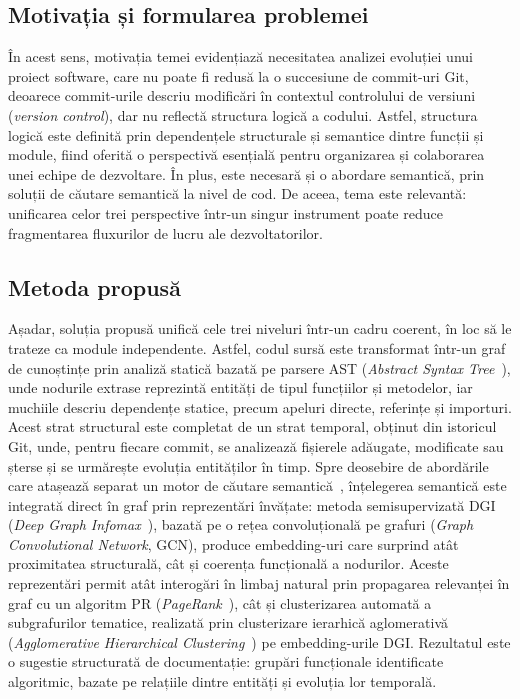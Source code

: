 \documentclass[12pt]{article}
\numberwithin{equation}{section}
\numberwithin{figure}{section}
\numberwithin{table}{section}
\theoremstyle{definition}
\theoremstyle{plain}
\begin{document}
\subsection{Motivația și formularea problemei}

În acest sens, motivația temei evidențiază necesitatea analizei evoluției unui proiect software, care nu poate fi redusă la o succesiune de commit-uri Git, deoarece commit-urile descriu modificări în contextul controlului de versiuni (\textit{version control}), dar nu reflectă structura logică a codului. Astfel, structura logică este definită prin dependențele structurale și semantice dintre funcții și module, fiind oferită o perspectivă esențială pentru organizarea și colaborarea unei echipe de dezvoltare. În plus, este necesară și o abordare semantică, prin soluții de căutare semantică la nivel de cod. De aceea, tema este relevantă: unificarea celor trei perspective într-un singur instrument poate reduce fragmentarea fluxurilor de lucru ale dezvoltatorilor.

\subsection{Metoda propusă}

Așadar, soluția propusă unifică cele trei niveluri într-un cadru coerent, în loc să le trateze ca module independente. Astfel, codul sursă este transformat într-un graf de cunoștințe prin analiză statică bazată pe parsere AST (\textit{Abstract Syntax Tree}~\cite{aho2006compilers}), unde nodurile extrase reprezintă entități de tipul funcțiilor și metodelor, iar muchiile descriu dependențe statice, precum apeluri directe, referințe și importuri. Acest strat structural este completat de un strat temporal, obținut din istoricul Git, unde, pentru fiecare commit, se analizează fișierele adăugate, modificate sau șterse și se urmărește evoluția entităților în timp. Spre deosebire de abordările care atașează separat un motor de căutare semantică~\cite{husain2019codesearchnet}, înțelegerea semantică este integrată direct în graf prin reprezentări învățate: metoda semisupervizată DGI (\textit{Deep Graph Infomax}~\cite{velickovic2019dgi}), bazată pe o rețea convoluțională pe grafuri (\textit{Graph Convolutional Network}, GCN), produce embedding-uri care surprind atât proximitatea structurală, cât și coerența funcțională a nodurilor. Aceste reprezentări permit atât interogări în limbaj natural prin propagarea relevanței în graf cu un algoritm PR (\textit{PageRank}~\cite{page1999pagerank}), cât și clusterizarea automată a subgrafurilor tematice, realizată prin clusterizare ierarhică aglomerativă (\textit{Agglomerative Hierarchical Clustering}~\cite{ward1963hierarchical}) pe embedding-urile DGI. Rezultatul este o sugestie structurată de documentație: grupări funcționale identificate algoritmic, bazate pe relațiile dintre entități și evoluția lor temporală.
\end{document}
